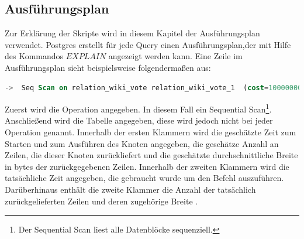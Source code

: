 \subsection{Ausführungsplan}
Zur Erklärung der Skripte wird in diesem Kapitel der Ausführungsplan verwendet.
Postgres erstellt für jede Query einen Ausführungsplan,der mit Hilfe des Kommandos $EXPLAIN$ angezeigt werden kann.
Eine Zeile im Ausführungsplan sieht beispielsweise folgendermaßen aus:
\begin{lstlisting}[language=SQL,caption = Zeile im Ausführungsplan,frame=single, label={2.lineInQueryPlan.listing} ]
    ->  Seq Scan on relation_wiki_vote relation_wiki_vote_1  (cost=10000000000.00..10000001649.62 rows=100762 width=8) (actual time=0.002..4.758 rows=100762 loops=1)
\end{lstlisting}
Zuerst wird die Operation angegeben. In diesem Fall ein Sequential Scan\footnote{Der Sequential Scan liest alle Datenblöcke sequenziell\cite[S.211]{froehlich01}.}.
Anschließend wird die Tabelle angegeben, diese wird jedoch nicht bei jeder Operation genannt.
Innerhalb der ersten Klammern wird die geschätzte Zeit zum Starten und zum Ausführen des Knoten angegeben, die geschätze Anzahl an Zeilen, die dieser Knoten zurückliefert und die geschätzte durchschnittliche Breite in bytes der zurückgegebenen Zeilen.
Innerhalb der zweiten Klammern wird die tatsächliche Zeit angegeben, die gebraucht wurde um den Befehl auszuführen.
Darüberhinaus enthält die zweite Klammer die Anzahl der tatsächlich zurückgelieferten Zeilen und deren zugehörige Breite \cite{postgresQueryPlan}.

